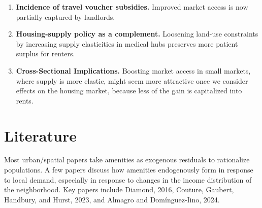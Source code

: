 \documentclass[11pt]{article}
\begin{document}
\begin{enumerate}[label=(\roman*), leftmargin=*]
    \item \textbf{Incidence of travel voucher subsidies.}  
          Improved market access is now partially captured by landlords.  
    \item \textbf{Housing-supply policy as a complement.}  
          Loosening land-use constraints by increasing supply elasticities in medical hubs preserves more patient surplus for renters.  
    \item \textbf{Cross-Sectional Implications.}  
          Boosting market access in small markets, where supply is more elastic, might seem more attractive once we consider effects on the housing market, because less of the gain is capitalized into rents.
\end{enumerate}





\section{Literature}
Most urban/spatial papers take amenities as exogenous residuals to rationalize populations. A few papers discuss how amenities endogenously form in response to local demand, especially in response to changes in the income distribution of the neighborhood. Key papers include Diamond, 2016, Couture, Gaubert, Handbury, and Hurst, 2023, and Almagro and Domínguez-Iino, 2024. 
\end{document}

